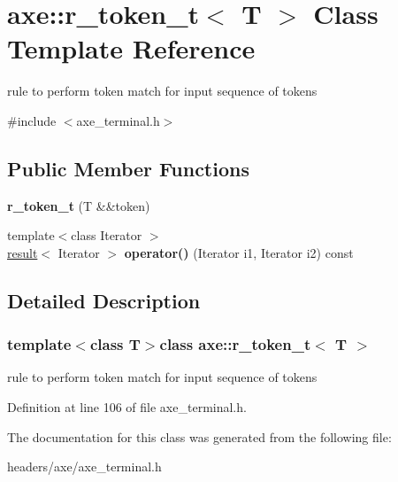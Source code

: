 \hypertarget{classaxe_1_1r__token__t}{\section{axe\+:\+:r\+\_\+token\+\_\+t$<$ T $>$ Class Template Reference}
\label{classaxe_1_1r__token__t}
}


rule to perform token match for input sequence of tokens  




{\ttfamily \#include $<$axe\+\_\+terminal.\+h$>$}

\subsection*{Public Member Functions}
\begin{DoxyCompactItemize}
\item 
\hypertarget{classaxe_1_1r__token__t_aaf2626d2886ece90b6847575a8063887}{{\bfseries r\+\_\+token\+\_\+t} (T \&\&token)}\label{classaxe_1_1r__token__t_aaf2626d2886ece90b6847575a8063887}

\item 
\hypertarget{classaxe_1_1r__token__t_a566a14a699de77e7d1c1c8ec192acb28}{{\footnotesize template$<$class Iterator $>$ }\\\hyperlink{structaxe_1_1result}{result}$<$ Iterator $>$ {\bfseries operator()} (Iterator i1, Iterator i2) const }\label{classaxe_1_1r__token__t_a566a14a699de77e7d1c1c8ec192acb28}

\end{DoxyCompactItemize}


\subsection{Detailed Description}
\subsubsection*{template$<$class T$>$class axe\+::r\+\_\+token\+\_\+t$<$ T $>$}

rule to perform token match for input sequence of tokens 

Definition at line 106 of file axe\+\_\+terminal.\+h.



The documentation for this class was generated from the following file\+:\begin{DoxyCompactItemize}
\item 
headers/axe/axe\+\_\+terminal.\+h\end{DoxyCompactItemize}
